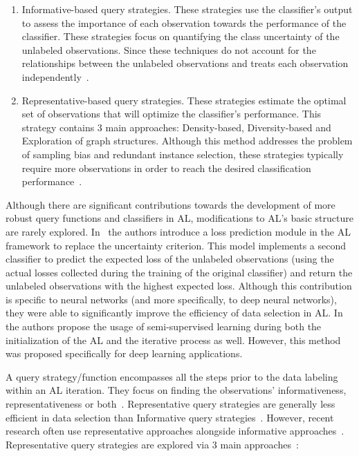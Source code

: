 \begin{enumerate}

    \item Informative-based query strategies. These strategies use the
        classifier's output to assess the importance of each observation
        towards the performance of the classifier. These strategies focus on
        quantifying the class uncertainty of the unlabeled observations.
        Since these techniques do not account for the relationships between
        the unlabeled observations and treats each observation
        independently~\cite{Fu2013}.

    \item Representative-based query strategies. These strategies estimate the
        optimal set of observations that will optimize the classifier's
        performance. This strategy contains 3 main approaches: Density-based,
        Diversity-based and Exploration of graph structures. Although this
        method addresses the problem of sampling bias and redundant instance
        selection, these strategies typically require more observations in
        order to reach the desired classification
        performance~\cite{Kumar2020}.

\end{enumerate}

Although there are significant contributions towards the development of more
robust query functions and classifiers in AL, modifications to AL's basic
structure are rarely explored. In~\cite{Yoo2019} the authors introduce a loss
prediction module in the AL framework to replace the uncertainty criterion.
This model implements a second classifier to predict the expected loss of the
unlabeled observations (using the actual losses collected during the training
of the original classifier) and return the unlabeled observations with the
highest expected loss. Although this contribution is specific to neural
networks (and more specifically, to deep neural networks), they were able to
significantly improve the efficiency of data selection in AL\@.
In~\cite{Simeoni2020} the authors propose the usage of semi-supervised
learning during both the initialization of the AL and the iterative process as
well. However, this method was proposed specifically for deep learning
applications.

A query strategy/function encompasses all the steps prior to the data labeling
within an AL iteration. They focus on finding the observations'
informativeness, representativeness or both~\cite{Gu2021, Kumar2020}.
Representative query strategies are generally less efficient in data selection
than Informative query strategies~\cite{Kumar2020}. However, recent research
often use representative approaches alongside informative
approaches~\cite{Gu2021, Samat2016}. Representative query strategies are
explored via 3 main approaches~\cite{Kumar2020}: 

